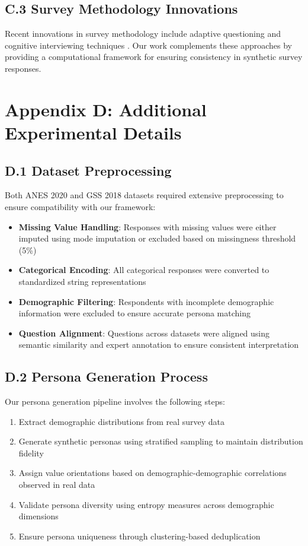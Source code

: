 \documentclass[sigconf, anonymous]{acmart}
\begin{document}
\subsection*{C.3 Survey Methodology Innovations}

Recent innovations in survey methodology include adaptive questioning \cite{kaplan2010adaptive} and cognitive interviewing techniques \cite{willis2005cognitive}. Our work complements these approaches by providing a computational framework for ensuring consistency in synthetic survey responses.

\newpage
\section*{Appendix D: Additional Experimental Details}

\subsection*{D.1 Dataset Preprocessing}

Both ANES 2020 and GSS 2018 datasets required extensive preprocessing to ensure compatibility with our framework:

\begin{itemize}
    \item \textbf{Missing Value Handling}: Responses with missing values were either imputed using mode imputation or excluded based on missingness threshold (5\%)
    \item \textbf{Categorical Encoding}: All categorical responses were converted to standardized string representations
    \item \textbf{Demographic Filtering}: Respondents with incomplete demographic information were excluded to ensure accurate persona matching
    \item \textbf{Question Alignment}: Questions across datasets were aligned using semantic similarity and expert annotation to ensure consistent interpretation
\end{itemize}

\subsection*{D.2 Persona Generation Process}

Our persona generation pipeline involves the following steps:

\begin{enumerate}
    \item Extract demographic distributions from real survey data
    \item Generate synthetic personas using stratified sampling to maintain distribution fidelity
    \item Assign value orientations based on demographic-demographic correlations observed in real data
    \item Validate persona diversity using entropy measures across demographic dimensions
    \item Ensure persona uniqueness through clustering-based deduplication
\end{enumerate}
\end{document}
